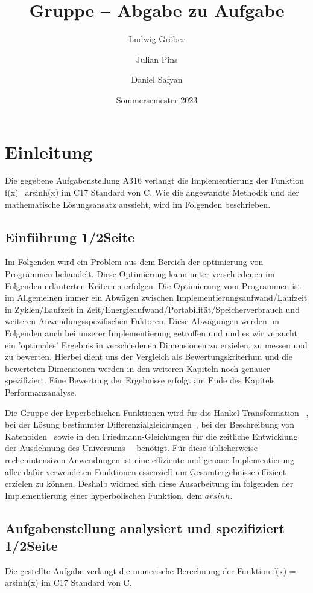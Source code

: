 \documentclass[course=erap] {aspdoc}
\author{Ludwig Gröber \and Julian Pins \and Daniel Safyan}
\date{Sommersemester 2023} %
\title{Gruppe \theGroup{} -- Abgabe zu Aufgabe \theNumber}
\begin{document}
    \maketitle


    \section{Einleitung}
    Die gegebene Aufgabenstellung A316 verlangt die Implementierung der Funktion f(x)=arsinh(x) im C17 Standard von C.
    Wie die angewandte Methodik und der mathematische Lösungsansatz aussieht, wird im Folgenden beschrieben.

    \subsection{Einführung 1/2Seite}
    Im Folgenden wird ein Problem aus dem Bereich der optimierung von Programmen behandelt.
    Diese Optimierung kann unter verschiedenen im Folgenden erläuterten Kriterien erfolgen.
    Die Optimierung vom Programmen ist im Allgemeinen immer ein Abwägen zwischen Implementierungsaufwand/Laufzeit in Zyklen/Laufzeit in Zeit/Energieaufwand/Portabilität/Speicherverbrauch und weiteren Anwendungsspezifischen Faktoren.
    Diese Abwägungen werden im Folgenden auch bei unserer Implementierung getroffen und und es wir versucht ein 'optimales' Ergebnis in verschiedenen Dimensionen zu erzielen, zu messen und zu bewerten.
    Hierbei dient uns der Vergleich als Bewertungskriterium und die bewerteten Dimensionen werden in den weiteren Kapiteln noch genauer spezifiziert.
    Eine Bewertung der Ergebnisse erfolgt am Ende des Kapitels Performanzanalyse.


    Die Gruppe der hyperbolischen Funktionen wird für die Hankel-Transformation~\cite{hankel} ,
    bei der Lösung bestimmter Differenzialgleichungen~\cite{differenzial}, bei der Beschreibung von Katenoiden~\cite{katenoid}
    sowie in den Friedmann-Gleichungen für die zeitliche Entwicklung der Ausdehnung des Universums~\cite{universum1,universum2}~ benötigt.
    Für diese üblicherweise rechenintensiven Anwendungen ist eine effiziente und genaue Implementierung aller dafür verwendeten Funktionen essenziell um Gesamtergebnisse effizient erzielen zu können.
    Deshalb widmed sich diese Ausarbeitung im folgenden der Implementierung einer hyperbolischen Funktion, dem $arsinh$.

    \subsection{Aufgabenstellung analysiert und spezifiziert 1/2Seite}
    Die gestellte Aufgabe verlangt die numerische Berechnung der Funktion f(x) = arsinh(x) im C17 Standard von C.
\end{document}
